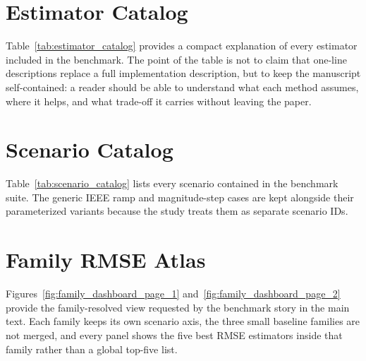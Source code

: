 \section{Estimator Catalog}
\label{app:estimators}

Table~\ref{tab:estimator_catalog} provides a compact explanation of every estimator included in the benchmark. The point of the table is not to claim that one-line descriptions replace a full implementation description, but to keep the manuscript self-contained: a reader should be able to understand what each method assumes, where it helps, and what trade-off it carries without leaving the paper.



\section{Scenario Catalog}
\label{app:scenarios}

Table~\ref{tab:scenario_catalog} lists every scenario contained in the benchmark suite. The generic IEEE ramp and magnitude-step cases are kept alongside their parameterized variants because the study treats them as separate scenario IDs.



\section{Family RMSE Atlas}
\label{app:family-atlas}

Figures~\ref{fig:family_dashboard_page_1} and~\ref{fig:family_dashboard_page_2} provide the family-resolved view requested by the benchmark story in the main text. Each family keeps its own scenario axis, the three small baseline families are not merged, and every panel shows the five best RMSE estimators inside that family rather than a global top-five list.


